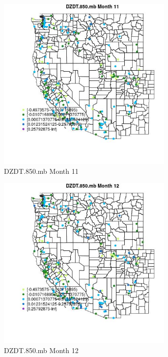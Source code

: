 \begin{figure} 
\centering  
\includegraphics[width=0.77\textwidth]{Code_Outputs/Report_ML_input_PM25_Step4_part_e_de_duplicated_aveswNAs_MapObsMo11DZDT850mb.jpg} 
\caption{\label{fig:Report_ML_input_PM25_Step4_part_e_de_duplicated_aveswNAsMapObsMo11DZDT850mb}DZDT.850.mb Month 11} 
\end{figure} 
 

\clearpage 

\begin{figure} 
\centering  
\includegraphics[width=0.77\textwidth]{Code_Outputs/Report_ML_input_PM25_Step4_part_e_de_duplicated_aveswNAs_MapObsMo12DZDT850mb.jpg} 
\caption{\label{fig:Report_ML_input_PM25_Step4_part_e_de_duplicated_aveswNAsMapObsMo12DZDT850mb}DZDT.850.mb Month 12} 
\end{figure} 
 


